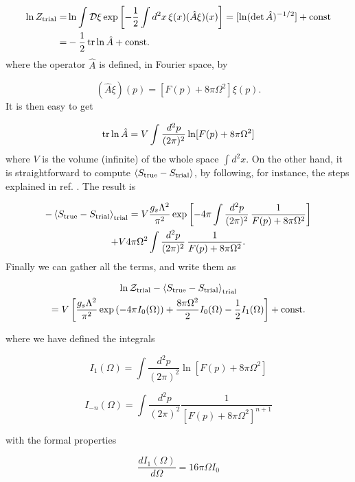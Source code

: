 \documentclass[a4paper,a4paper]{article}
\begin{document}
\begin{align}
\ln Z_{\text{trial}}=&\ln\int\mathcal{D}\xi\exp{\left[-\frac{1}{2}\int d^2x\,\xi(x)
(\hat{A}\xi)(x)\right]} = [\ln(\det\hat{A})^{-1/2}]+\text{const}
\\=&-\frac{1}{2}\operatorname{tr}\ln\hat{A} + \text{const}.
\end{align}
where the operator $\hat{A}$ is defined, in Fourier space, by

\begin{equation}
(\hat{A}\xi)(p)=[F(p)+8\pi\Omega^2]\xi(p).
\end{equation}
It is then easy to get

\begin{equation}
\operatorname{tr}\ln\hat{A}=V\int\frac{d^2p}{(2\pi)^2} \ln[F(p)+8\pi\Omega^2]
\end{equation}
where $V$ is the volume (infinite) of the whole space $\int d^2x$. On the
other hand, it is straightforward to compute $\langle S_{\text{true}}-S_{\text{trial}} \rangle$, by following,
for instance, the steps explained in ref. \cite{Li-Naon}. The result is

\begin{multline}
-\left\langle S_{\text{true}}-S_{\text{trial}} \right\rangle_{\text{trial}} = V\frac{g_s\Lambda^2}{\pi^2}
\exp\left[-4\pi\int\frac{d^2p}{(2\pi)^2}\,\frac{1}{F(p) + 8\pi\Omega^2}\right] \\+ V
4\pi\Omega^2\int\frac{d^2p}{(2\pi)^2}\,\frac{1}{F(p) + 8\pi\Omega^2}.
\end{multline}
Finally we can gather all the terms, and write them as

\begin{multline}\label{eq:elegant}
\ln\mathcal{Z}_{\text{trial}} - \left\langle S_{\text{true}}-S_{\text{trial}} \right\rangle_{\text{trial}}\\=V\left[\frac{g_s\Lambda^2}{\pi^2}
\exp\left(-4\pi I_0(\Omega)\right) + \frac{8\pi\Omega^2}{2}I_0(\Omega) -
\frac{1}{2}I_1(\Omega)\right] + \text{const}.
\end{multline}

\noindent where we have defined the integrals

\begin{equation}
I_1(\Omega)=\int \frac{d^2p}{(2\pi)^2} \ln[F(p) + 8\pi\Omega^2]
\end{equation}

\begin{equation}
I_{-n}(\Omega)=\int\frac{d^2p}{(2\pi)^2}\frac{1}{\left[F(p) +
8\pi\Omega^2\right]^{n+1}}
\end{equation}

\noindent with the formal properties

\begin{equation}
\frac{dI_1(\Omega)}{d\Omega}=16\pi\Omega I_0
\end{equation}
\end{document}
